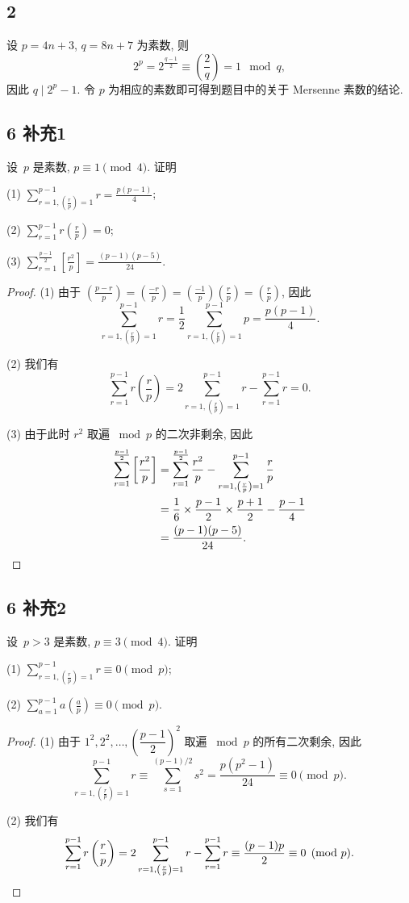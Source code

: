 \documentclass[12pt,a4paper,reqno]{amsart}
\theoremstyle{remark}
\newcommand{\leg}[2]{\left(\frac{#1}{#2}\right)}    %
\begin{document}
\subsection*{2}
设 $p=4n+3$, $q=8n+7$ 为素数, 则
  \[2^p=2^{\frac{q-1}{2}}\equiv \leg{2}{q}=1\mod q,\]
因此 $q\mid 2^p-1$. 令 $p$ 为相应的素数即可得到题目中的关于 Mersenne 素数的结论.

\subsection*{6 补充1}
设\ $p$ 是素数, $p\equiv 1\pmod 4$. 证明

(1) $\sum\limits_{r=1,\leg{r}{p}=1}^{p-1} r=\frac{p(p-1)}{4}$;

(2) $\sum\limits_{r=1}^{p-1} r\leg{r}{p}=0$;

(3) $\sum\limits_{r=1}^{\frac{p-1}{2}} \left[\frac{r^2}{p}\right]=\frac{(p-1)(p-5)}{24}.$

\begin{proof}
(1) 由于 $\leg{p-r}{p}=\leg{-r}{p}=\leg{-1}{p}\leg{r}{p}=\leg{r}{p}$, 因此
  \[
     \sum_{r=1,\leg{r}{p}=1}^{p-1} r
    =\frac{1}{2}\sum_{r=1,\leg{r}{p}=1}^{p-1} p
    =\frac{p(p-1)}{4}.
  \]

(2) 我们有
  \[
     \sum_{r=1}^{p-1} r\leg{r}{p}
    =2\sum_{r=1,\leg{r}{p}=1}^{p-1} r-\sum_{r=1}^{p-1} r=0.
  \]

(3) 由于此时 $r^2$ 取遍 $\bmod p$ 的二次非剩余, 因此
  \[\begin{split}
     \sum_{r=1}^{\frac{p-1}{2}} \left[\frac{r^2}{p}\right]
    &=\sum_{r=1}^{\frac{p-1}{2}}\frac{r^2}{p}
      -\sum_{r=1,\leg{r}{p}=1}^{p-1}\frac{r}{p}\\
    &=\frac{1}{6}\times\frac{p-1}{2}\times \frac{p+1}{2}-\frac{p-1}{4}\\
    &=\frac{(p-1)(p-5)}{24}.\qedhere
  \end{split}\]
\end{proof}

\subsection*{6 补充2}
设\ $p>3$ 是素数, $p\equiv 3\pmod 4$. 证明

(1) $\sum\limits_{r=1,\leg{r}{p}=1}^{p-1} r\equiv 0\pmod p$;

(2) $\sum\limits_{a=1}^{p-1} a\leg{a}{p}\equiv 0\pmod p.$

\begin{proof}
(1) 由于 $1^2,2^2,\ldots,(\dfrac{p-1}{2})^2$ 取遍 $\bmod p$ 的所有二次剩余, 因此
  \[
       \sum_{r=1,\leg{r}{p}=1}^{p-1} r
      \equiv \sum_{s=1}^{(p-1)/2} s^2
      =\frac{p(p^2-1)}{24}
      \equiv 0\pmod p.
  \]

(2) 我们有
  \[
     \sum_{r=1}^{p-1} r\leg{r}{p}
    =2\sum_{r=1,\leg{r}{p}=1}^{p-1} r-\sum_{r=1}^{p-1} r
    \equiv \frac{(p-1)p}{2}
    \equiv 0\pmod p.\qedhere
  \]
\end{proof}
\end{document}
